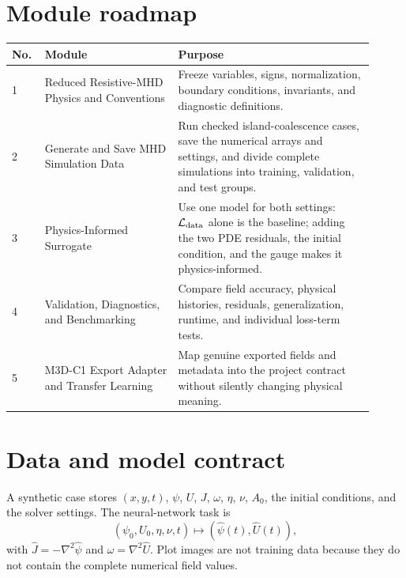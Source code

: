 \documentclass[11pt]{article}
\begin{document}
\section{Module roadmap}
\begin{singlespace}
\footnotesize
\renewcommand{\arraystretch}{1.12}
\begin{longtable}{p{0.07\linewidth} p{0.34\linewidth} p{0.50\linewidth}}
\toprule
\textbf{No.} & \textbf{Module} & \textbf{Purpose}\\
\midrule
1 & Reduced Resistive-MHD Physics and Conventions & Freeze variables, signs, normalization, boundary conditions, invariants, and diagnostic definitions.\\
2 & Generate and Save MHD Simulation Data & Run checked island-coalescence cases, save the numerical arrays and settings, and divide complete simulations into training, validation, and test groups.\\
3 & Physics-Informed Surrogate & Use one model for both settings: $\mathcal L_{\rm data}$ alone is the baseline; adding the two PDE residuals, the initial condition, and the gauge makes it physics-informed.\\
4 & Validation, Diagnostics, and Benchmarking & Compare field accuracy, physical histories, residuals, generalization, runtime, and individual loss-term tests.\\
5 & M3D-C1 Export Adapter and Transfer Learning & Map genuine exported fields and metadata into the project contract without silently changing physical meaning.\\
\bottomrule
\end{longtable}
\normalsize
\end{singlespace}

\section{Data and model contract}
A synthetic case stores $(x,y,t)$, $\psi$, $U$, $J$, $\omega$, $\eta$, $\nu$, $A_0$, the initial conditions, and the solver settings. The neural-network task is
\begin{equation}
 (\psi_0,U_0,\eta,\nu,t)\longmapsto(\widehat\psi(t),\widehat U(t)),
\end{equation}
with $\widehat J=-\nabla^2\widehat\psi$ and $\widehat\omega=\nabla^2\widehat U$. Plot images are not training data because they do not contain the complete numerical field values.
\end{document}
